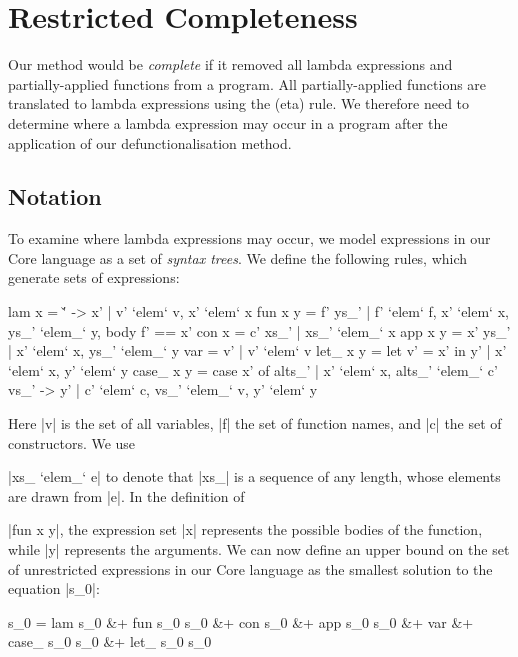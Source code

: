 \section{Restricted Completeness}
\label{secF:completeness}


Our method would be \textit{complete} if it removed all lambda expressions and partially-applied functions from a program. All partially-applied functions are translated to lambda expressions using the (eta) rule. We therefore need to determine where a lambda expression may occur in a program after the application of our defunctionalisation method.

\subsection{Notation}

To examine where lambda expressions may occur, we model expressions in our Core language as a set of \textit{syntax trees}. We define the following rules, which generate sets of expressions:

\ignore\begin{code}
lam x      = {\v' -> x' | v' `elem` v, x' `elem` x}
fun x y    = {f' ys_' | f' `elem` f, x' `elem` x, ys_' `elem_` y, body f' == x'}
con x      = {c' xs_' | xs_' `elem_` x}
app x y    = {x' ys_' | x' `elem` x, ys_' `elem_` y}
var        = {v' | v' `elem` v}
let_ x y   = {let v' = x' in y' | x' `elem` x, y' `elem` y}
case_ x y  = {case  x' of alts_' | x' `elem` x,
                    alts_' `elem_` {c' vs_' -> y' | c' `elem` c, vs_' `elem_` v, y' `elem` y}}
\end{code}

Here |v| is the set of all variables, |f| the set of function names, and |c| the set of constructors. We use \ignore|xs_ `elem_` e| to denote that |xs_| is a sequence of any length, whose elements are drawn from |e|. In the definition of \ignore|fun x y|, the expression set |x| represents the possible bodies of the function, while |y| represents the arguments. We can now define an upper bound on the set of unrestricted expressions in our Core language as the smallest solution to the equation |s_0|:

\ignore\begin{code}
s_0  =  lam s_0 &+ fun s_0 s_0 &+ con s_0 &+ app s_0 s_0 &+ var &+
        case_ s_0 s_0 &+ let_ s_0 s_0
\end{code}

